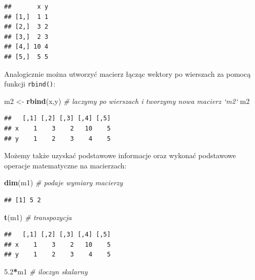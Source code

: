 \documentclass[]{book}
\newenvironment{Shaded}{\begin{snugshade}}{\end{snugshade}}
\newcommand{\KeywordTok}[1]{\textcolor[rgb]{0.13,0.29,0.53}{\textbf{#1}}}
\newcommand{\FloatTok}[1]{\textcolor[rgb]{0.00,0.00,0.81}{#1}}
\newcommand{\StringTok}[1]{\textcolor[rgb]{0.31,0.60,0.02}{#1}}
\newcommand{\CommentTok}[1]{\textcolor[rgb]{0.56,0.35,0.01}{\textit{#1}}}
\newcommand{\OperatorTok}[1]{\textcolor[rgb]{0.81,0.36,0.00}{\textbf{#1}}}
\newcommand{\NormalTok}[1]{#1}
\theoremstyle{definition}
\theoremstyle{definition}
\theoremstyle{definition}
\theoremstyle{remark}
\begin{document}
\begin{verbatim}
##       x y
## [1,]  1 1
## [2,]  3 2
## [3,]  2 3
## [4,] 10 4
## [5,]  5 5
\end{verbatim}

Analogicznie można utworzyć macierz łącząc wektory po wierszach za
pomocą funkcji \texttt{rbind()}:

\begin{Shaded}
\begin{Highlighting}[]
\NormalTok{m2 <-}\StringTok{ }\KeywordTok{rbind}\NormalTok{(x,y) }\CommentTok{# laczymy po wierszach i tworzymy nowa macierz `m2`}
\NormalTok{m2}
\end{Highlighting}
\end{Shaded}

\begin{verbatim}
##   [,1] [,2] [,3] [,4] [,5]
## x    1    3    2   10    5
## y    1    2    3    4    5
\end{verbatim}

Możemy także uzyskać podstawowe informacje oraz wykonać podstawowe
operacje matematyczne na macierzach:

\begin{Shaded}
\begin{Highlighting}[]
\KeywordTok{dim}\NormalTok{(m1) }\CommentTok{# podaje wymiary macierzy}
\end{Highlighting}
\end{Shaded}

\begin{verbatim}
## [1] 5 2
\end{verbatim}

\begin{Shaded}
\begin{Highlighting}[]
\KeywordTok{t}\NormalTok{(m1) }\CommentTok{# transpozycja}
\end{Highlighting}
\end{Shaded}

\begin{verbatim}
##   [,1] [,2] [,3] [,4] [,5]
## x    1    3    2   10    5
## y    1    2    3    4    5
\end{verbatim}

\begin{Shaded}
\begin{Highlighting}[]
\FloatTok{5.2}\OperatorTok{*}\NormalTok{m1 }\CommentTok{# iloczyn skalarny}
\end{Highlighting}
\end{Shaded}
\end{document}
